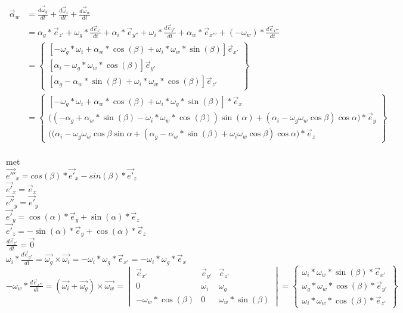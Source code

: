 \documentclass[a4paper,10pt]{article}
\begin{document}
\begin{equation}
\begin{aligned}
\vec{\alpha}_{w} &= \frac{d\vec{\omega}_{g}}{dt} + \frac{d\vec{\omega}_{i}}{dt} + \frac{d\vec{\omega}_{w}}{dt}\\
&= \alpha_g *  \vec{e}_{z'} + \omega_g * \frac{d\vec{e}_{z'}}{dt} + \alpha_i *  \vec{e}_{y''} + \omega_i * \frac{d\vec{e}_{y''}}{dt} + \alpha_w * \vec{e}_{x'''} + (-\omega_w) * \frac{d\vec{e}_{x'''}}{dt}\\
&=\begin{Bmatrix}
[- {\omega}_{g} * {\omega}_{i} + \alpha_w*\cos(\beta) +\omega_i*\omega_w * \sin(\beta) ]\vec{e}_{x'} \\
[\alpha_i - \omega_g*\omega_w*\cos(\beta)]\vec{e}_{y'}\\
[\alpha_g  -\alpha_w*\sin(\beta)+ \omega_i*\omega_w*\cos(\beta)]\vec{e}_{z'}
\end{Bmatrix}\\
&=\begin{Bmatrix}
[- {\omega}_{g} * {\omega}_{i} + \alpha_w*\cos(\beta) +\omega_i*\omega_g*\sin(\beta) ]* \vec{e}_{x} \\
\Big((-\alpha_g  +\alpha_w*\sin(\beta)- \omega_i*\omega_w*\cos(\beta)) \sin(\alpha) + (\alpha_i - \omega_g\omega_w\cos{\beta})\cos{\alpha}  \Big) * \vec{e}_{y} \\
\Big((\alpha_i - \omega_g\omega_w\cos{\beta}\sin{\alpha} + (\alpha_g  -\alpha_w*\sin(\beta)+ \omega_i\omega_w\cos{\beta}) \cos{\alpha} \Big) * \vec{e}_{z}
\end{Bmatrix}
\end{aligned}
\end{equation}\\
met \\
$\vec{e'''}_{x} = cos(\beta) *\vec{e'}_{x} - sin(\beta) *\vec{e'}_{z}$\\
$\vec{e'}_{x}=\vec{e}_{x}$\\
$\vec{e''}_{y} = \vec{e'}_{y} $\\
$\vec{e'}_{y} = \cos(\alpha)*\vec{e}_{y} + \sin(\alpha)*\vec{e}_z $\\
$\vec{e'}_{z} = -\sin(\alpha)*\vec{e}_{y} + \cos(\alpha)*\vec{e}_z $\\
$\frac{d\vec{e}_{z'}}{dt}=\vec{0}$\\
$\omega_i * \frac{d\vec{e}_{y''}}{dt}=\vec{\omega_g}\times\vec{\omega_i} = -\omega_i * \omega_g *\vec{e}_{x'} = -\omega_i * \omega_g *\vec{e}_{x}  $\\
$-\omega_w * \frac{d\vec{e}_{x'''}}{dt} = (\vec{\omega_i} + \vec{\omega_g})\times\vec{\omega_w} = \begin{vmatrix}
\vec{e}_{x'}&\vec{e}_{y'}&\vec{e}_{z'}\\
0 & \omega_i & \omega_g\\
-\omega_w * \cos(\beta) & 0 & \omega_w * \sin(\beta)
\end{vmatrix} = \begin{Bmatrix}
\omega_i*\omega_w * \sin(\beta)  *\vec{e}_{x'} \\
\omega_g*\omega_w *\cos(\beta) *\vec{e}_{y'}\\
\omega_i*\omega_w * \cos(\beta) *\vec{e}_{z'}
\end{Bmatrix}
$
\end{document}
